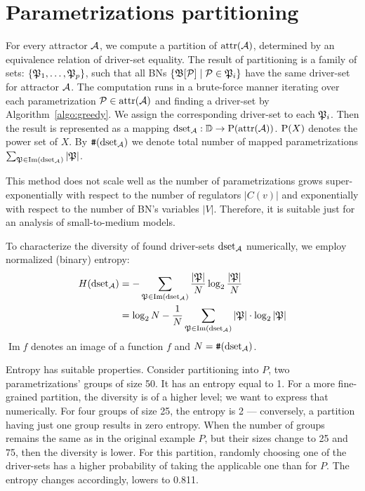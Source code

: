\documentclass[
	digital, oneside, nosansbold, nocolorbold, nolot, nolof
]{fithesis4}
\theoremstyle{definition}
\theoremstyle{definition}
\DeclareMathOperator{\attrf}{attr}
\DeclareMathOperator{\im}{Im}
\DeclarePairedDelimiter{\set}{\{}{\}}
\begin{document}
\section{Parametrizations partitioning}

For every attractor $\mathcal{A}$, we compute a partition of
$\attrf(\attr{A})$, determined by an equivalence relation of
driver-set equality. The result of partitioning is a family of sets:
$\set{\paronset{P}_1, \ldots, \paronset{P}_p}$, such that all BNs
$\set{\PBN{B}[\paron{P}] \mid \paron{P} \in \paronset{P}_i}$ have the same
driver-set for attractor $\mathcal{A}$. The computation runs in a brute-force
manner iterating over each parametrization $\paron{P} \in
\attrf(\attr{A})$ and finding a driver-set by
Algorithm~\ref{algo:greedy}. We assign the corresponding driver-set to each
$\mathfrak{P}_i$. Then the result is represented as a mapping $\dsetfmacro{A}:
\dsetsp \to \pset{\attrf(\attr{A})}$. $\mathrm{P}(X)$ denotes the power set of $X$.
By $\texttt{\#}(\operatorname{dset}_{\mathcal{A}})$ we denote total number of mapped parametrizations
$\sum_{\paronset{P} \in \im(\dsetfmacro{A})} |\paronset{P}|$.

This method does not scale well as the number of
parametrizations grows super-exponentially with respect to the number of
regulators $|C(v)|$ and exponentially with respect to the number of BN's
variables $|V|$. Therefore, it is suitable just for an analysis of
small-to-medium models.

To characterize the diversity of found driver-sets $\operatorname{dset}_{\mathcal{A}}$
numerically, we employ normalized (binary) entropy:
\begin{align} \label{formula:entropy}
    H(\dsetfmacro{A})
    &= - \sum_{\paronset{P} \in \im(\dsetfmacro{A})}
        \frac{|\paronset{P}|}{N} \log_2 \frac{|\paronset{P}|}{N} \\
    &= \log_2 N - \frac{1}{N} \sum_{\paronset{P} \in \im(\dsetfmacro{A})}
        |\paronset{P}| \cdot \log_2 |\paronset{P}| \nonumber
\end{align}
$\im{f}$ denotes an image of a function $f$ and $N = \texttt{\#}(\operatorname{dset}_{\mathcal{A}})$.

Entropy has suitable properties. Consider partitioning into $P$, two
parametrizations' groups of size 50. It has an entropy equal to 1. For a more
fine-grained partition, the diversity is of a higher level; we want to express
that numerically. For four groups of size 25, the entropy is 2 --- conversely,
a partition having just one group results in zero entropy. When the number of
groups remains the same as in the original example $P$, but their sizes change
to 25 and 75, then the diversity is lower. For this partition, randomly
choosing one of the driver-sets has a higher probability of taking the
applicable one than for $P$. The entropy changes accordingly, lowers to 0.811.
\end{document}
